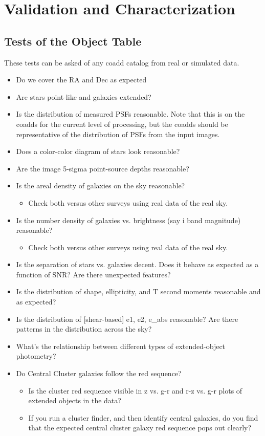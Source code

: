 \documentclass[11pt]{report}
\begin{document}
\section{Validation and Characterization}
\label{sec:validation}

\subsection{Tests of the Object Table}

These tests can be asked of any coadd catalog from real or simulated data.

\begin{itemize}
  \item Do we cover the RA and Dec as expected
  \item Are stars point-like and galaxies extended?
  \item Is the distribution of measured PSFs reasonable.  Note that this is on the coadds for the current level of processing, but the coadds should be representative of the distribution of PSFs from the input images.
  \item Does a color-color diagram of stars look reasonable?
  \item Are the image 5-sigma point-source depths reasonable?
  \item Is the areal density of galaxies on the sky reasonable?
      \begin{itemize}
          \item Check both versus other surveys using real data of the real sky. 
      \end{itemize}
  \item Is the number density of galaxies vs. brightness (say i band magnitude) reasonable?
      \begin{itemize}
          \item Check both versus other surveys using real data of the real sky. 
      \end{itemize}
  \item Is the separation of stars vs. galaxies decent.  Does it behave as expected as a function of SNR?  Are there unexpected features?
  \item Is the distribution of shape, ellipticity, and T second moments reasonable and as expected?
  \item Is the distribution of [shear-based] e1, e2, e_abs reasonable?  Are there patterns in the distribution across the sky?
  \item What's the relationship between different types of extended-object photometry?
  \item Do Central Cluster galaxies follow the red sequence?
  \begin{itemize}
      \item Is the cluster red sequence visible in z vs. g-r and r-z vs. g-r plots of extended objects in the data?
      \item If you run a cluster finder, and then identify central galaxies, do you find that the expected central cluster galaxy red sequence pops out clearly?
  \end{itemize}

\end{itemize}
\end{document}
